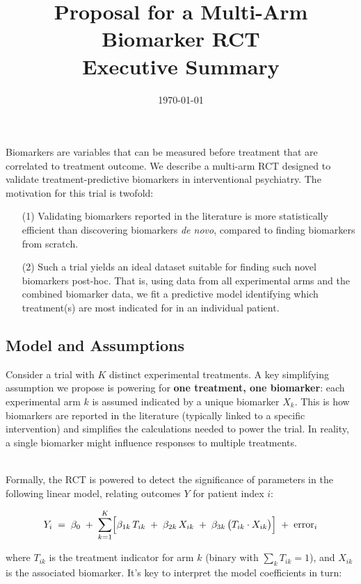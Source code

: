 \documentclass[11pt]{article}
\title{Proposal for a Multi-Arm Biomarker RCT\\Executive Summary}
\author{}
\date{\today}
\begin{document}
\maketitle

Biomarkers are variables that can be measured before treatment that are correlated to treatment outcome. We describe a multi-arm RCT designed to validate treatment-predictive biomarkers in interventional psychiatry. The motivation for this trial is twofold: 
\begin{enumerate}
\item[(1)] Validating biomarkers reported in the literature is more statistically efficient than discovering biomarkers \emph{de novo}, compared to finding biomarkers from scratch.
\item[(2)] Such a trial yields an ideal dataset suitable for finding such novel biomarkers post-hoc. That is, using data from all experimental arms and the combined biomarker data, we fit a predictive model identifying which treatment(s) are most indicated for in an individual patient.
\end{enumerate}

\subsection*{Model and Assumptions}

Consider a trial with \(K\) distinct experimental treatments. A key simplifying assumption we propose is powering for \textbf{one treatment, one biomarker}: each experimental arm \(k\) is assumed indicated by a unique biomarker \(X_k\). This is how biomarkers are reported in the literature (typically linked to a specific intervention) and simplifies the calculations needed to power the trial. In reality, a single biomarker might influence responses to multiple treatments.

\ \\
Formally, the RCT is powered to detect the significance of parameters in the following linear model, relating outcomes \(Y\) for patient index \(i\):

\[
  Y_i \;=\; \beta_0
  \;+\; \sum_{k=1}^K \Bigl[
      \beta_{1k}\,T_{ik}
    \;+\;\beta_{2k}\,X_{ik}
    \;+\;\beta_{3k}\,\bigl(T_{ik} \cdot X_{ik}\bigr)
  \Bigr]
  \;+\;\text{error}_i
\]

where \(T_{ik}\) is the treatment indicator for arm $k$ (binary with \(\sum_k T_{ik}=1\)), and \(X_{ik}\) is the associated biomarker. It's key to interpret the model coefficients in turn:
\end{document}
